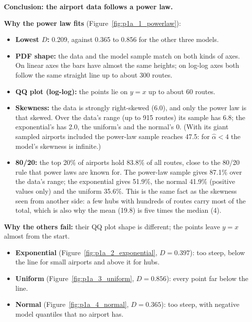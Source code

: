 \documentclass[11pt]{article}
\begin{document}
\begin{enumerate}
{    \textbf{Conclusion: the airport data follows a power law.}

    \textbf{Why the power law fits} (Figure~\ref{fig:p1a_1_powerlaw}):
    \begin{itemize}
      \item \textbf{Lowest $D$:} 0.209, against 0.365 to 0.856 for the other three models.
      \item \textbf{PDF shape:} the data and the model sample match on both kinds of axes.
            On linear axes the bars have almost the same heights; on log-log axes both follow
            the same straight line up to about 300 routes.
      \item \textbf{QQ plot (log-log):} the points lie on $y = x$ up to about 60 routes.
      \item \textbf{Skewness:} the data is strongly right-skewed (6.0), and only the power
            law is that skewed. Over the data's range (up to 915 routes) its sample has 6.8;
            the exponential's has 2.0, the uniform's and the normal's 0. (With its giant
            sampled airports included the power-law sample reaches 47.5: for
            $\hat\alpha < 4$ the model's skewness is infinite.)
      \item \textbf{80/20:} the top 20\% of airports hold 83.8\% of all routes, close to the
            80/20 rule that power laws are known for. The power-law sample gives 87.1\% over
            the data's range; the exponential gives 51.9\%, the normal 41.9\% (positive
            values only) and the uniform 35.6\%. This is the same fact as the skewness seen
            from another side: a few hubs with hundreds of routes carry most of the total,
            which is also why the mean (19.8) is five times the median (4).
    \end{itemize}

    \textbf{Why the others fail:} their QQ plot shape is different; the points leave
    $y = x$ almost from the start.
    \begin{itemize}
      \item \textbf{Exponential} (Figure~\ref{fig:p1a_2_exponential}, $D = 0.397$): too
            steep, below the line for small airports and above it for hubs.
      \item \textbf{Uniform} (Figure~\ref{fig:p1a_3_uniform}, $D = 0.856$): every point far
            below the line.
      \item \textbf{Normal} (Figure~\ref{fig:p1a_4_normal}, $D = 0.365$): too steep, with
            negative model quantiles that no airport has.
    \end{itemize}}
\end{enumerate}
\end{document}
